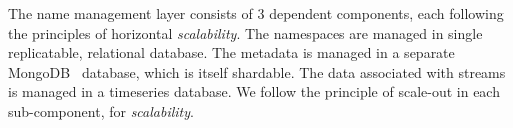 The name management layer consists of 3 dependent components, each following the principles of horizontal \emph{scalability}.  The namespaces are
managed in single replicatable, relational database.  The metadata is managed in a separate MongoDB~\cite{mongodb} database, which is itself
shardable.  The data associated with streams is managed in a timeseries database.  We follow the principle of scale-out
in each sub-component, for \emph{scalability}.











